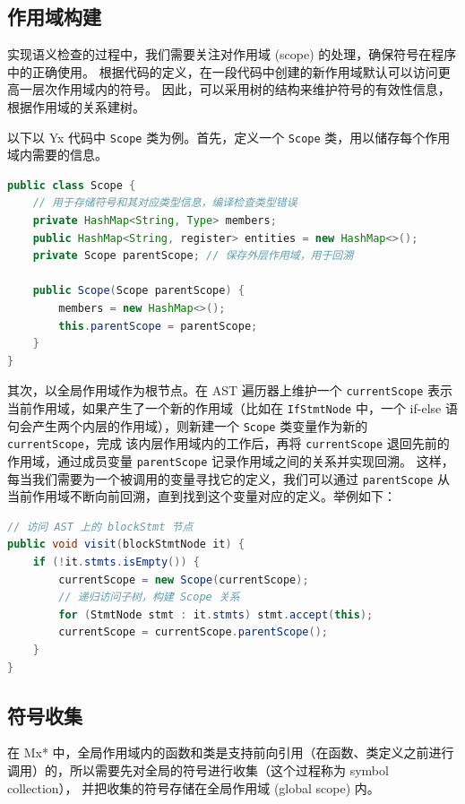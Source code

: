 
\subsection{作用域构建}
实现语义检查的过程中，我们需要关注对作用域 (scope) 的处理，确保符号在程序中的正确使用。
根据代码的定义，在一段代码中创建的新作用域默认可以访问更高一层次作用域内的符号。
因此，可以采用树的结构来维护符号的有效性信息，根据作用域的关系建树。

以下以 Yx 代码中 \texttt{Scope} 类为例。首先，定义一个 \texttt{Scope} 类，用以储存每个作用域内需要的信息。
\begin{lstlisting}[language=Java]
public class Scope {
    // 用于存储符号和其对应类型信息，编译检查类型错误
    private HashMap<String, Type> members;
    public HashMap<String, register> entities = new HashMap<>();
    private Scope parentScope; // 保存外层作用域，用于回溯

    public Scope(Scope parentScope) {
        members = new HashMap<>();
        this.parentScope = parentScope;
    }
}
\end{lstlisting}

其次，以全局作用域作为根节点。在 AST 遍历器上维护一个 \texttt{currentScope}
表示当前作用域，如果产生了一个新的作用域（比如在 \texttt{IfStmtNode} 中，一个 if-else
语句会产生两个内层的作用域），则新建一个 \texttt{Scope} 类变量作为新的 \texttt{currentScope}，完成
该内层作用域内的工作后，再将 \texttt{currentScope} 退回先前的作用域，通过成员变量
\texttt{parentScope} 记录作用域之间的关系并实现回溯。
这样，每当我们需要为一个被调用的变量寻找它的定义，我们可以通过 \texttt{parentScope}
从当前作用域不断向前回溯，直到找到这个变量对应的定义。举例如下：
\begin{lstlisting}[language=Java]
// 访问 AST 上的 blockStmt 节点
public void visit(blockStmtNode it) {
    if (!it.stmts.isEmpty()) {
        currentScope = new Scope(currentScope);
        // 递归访问子树，构建 Scope 关系
        for (StmtNode stmt : it.stmts) stmt.accept(this);
        currentScope = currentScope.parentScope();
    }
}
\end{lstlisting}

\subsection{符号收集}
在 Mx* 中，全局作用域内的函数和类是支持前向引用（在函数、类定义之前进行调用）的，所以需要先对全局的符号进行收集（这个过程称为 symbol collection），
并把收集的符号存储在全局作用域 (global scope) 内。

